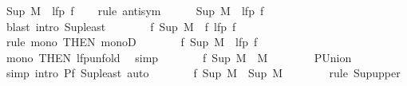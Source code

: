 \begin{isabellebody}
\ {\isachardoublequoteopen}Sup\ {\isacharquery}{\kern0pt}M\ {\isacharequal}{\kern0pt}\ lfp\ f{\isachardoublequoteclose}\isanewline
\ \ \isamarkupfalse%
\ {\isacharparenleft}{\kern0pt}rule\ antisym{\isacharparenright}{\kern0pt}\isanewline
\ \ \ \ \isamarkupfalse%
\ {\isachardoublequoteopen}Sup\ {\isacharquery}{\kern0pt}M\ {\isasymle}\ lfp\ f{\isachardoublequoteclose}\isanewline
\ \ \ \ \ \ \isamarkupfalse%
\ {\isacharparenleft}{\kern0pt}blast\ intro{\isacharcolon}{\kern0pt}\ Sup{\isacharunderscore}{\kern0pt}least{\isacharparenright}{\kern0pt}\isanewline
\ \ \ \ \isamarkupfalse%
\ \isamarkupfalse%
\ {\isachardoublequoteopen}f\ {\isacharparenleft}{\kern0pt}Sup\ {\isacharquery}{\kern0pt}M{\isacharparenright}{\kern0pt}\ {\isasymle}\ f\ {\isacharparenleft}{\kern0pt}lfp\ f{\isacharparenright}{\kern0pt}{\isachardoublequoteclose}\isanewline
\ \ \ \ \ \ \isamarkupfalse%
\ {\isacharparenleft}{\kern0pt}rule\ mono\ {\isacharbrackleft}{\kern0pt}THEN\ monoD{\isacharbrackright}{\kern0pt}{\isacharparenright}{\kern0pt}\isanewline
\ \ \ \ \isamarkupfalse%
\ \isamarkupfalse%
\ {\isachardoublequoteopen}f\ {\isacharparenleft}{\kern0pt}Sup\ {\isacharquery}{\kern0pt}M{\isacharparenright}{\kern0pt}\ {\isasymle}\ lfp\ f{\isachardoublequoteclose}\isanewline
\ \ \ \ \ \ \isamarkupfalse%
\ mono\ {\isacharbrackleft}{\kern0pt}THEN\ lfp{\isacharunderscore}{\kern0pt}unfold{\isacharbrackright}{\kern0pt}\ \isamarkupfalse%
\ simp\isanewline
\ \ \ \ \isamarkupfalse%
\ \isamarkupfalse%
\ {\isachardoublequoteopen}f\ {\isacharparenleft}{\kern0pt}Sup\ {\isacharquery}{\kern0pt}M{\isacharparenright}{\kern0pt}\ {\isasymin}\ {\isacharquery}{\kern0pt}M{\isachardoublequoteclose}\isanewline
\ \ \ \ \ \ \isamarkupfalse%
\ P{\isacharunderscore}{\kern0pt}Union\ \isamarkupfalse%
\ simp\ {\isacharparenleft}{\kern0pt}intro\ P{\isacharunderscore}{\kern0pt}f\ Sup{\isacharunderscore}{\kern0pt}least{\isacharcomma}{\kern0pt}\ auto{\isacharparenright}{\kern0pt}\isanewline
\ \ \ \ \isamarkupfalse%
\ \isamarkupfalse%
\ {\isachardoublequoteopen}f\ {\isacharparenleft}{\kern0pt}Sup\ {\isacharquery}{\kern0pt}M{\isacharparenright}{\kern0pt}\ {\isasymle}\ Sup\ {\isacharquery}{\kern0pt}M{\isachardoublequoteclose}\isanewline
\ \ \ \ \ \ \isamarkupfalse%
\ {\isacharparenleft}{\kern0pt}rule\ Sup{\isacharunderscore}{\kern0pt}upper{\isacharparenright}{\kern0pt}\isanewline

\end{isabellebody}
